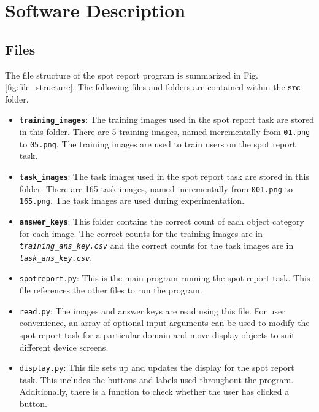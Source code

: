 \documentclass[preprint,12pt, a4paper]{elsarticle}
\begin{document}
\section{Software Description}

\subsection{Files}
The file structure of the spot report program is summarized in Fig.\ref{fig:file_structure}. The following files and folders are contained within the \textbf{src} folder. 

\begin{itemize}
    \item \texttt{\textbf{training\_images}}: The training images used in the spot report task are stored in this folder. There are 5 training images, named incrementally from \texttt{01.png} to \texttt{05.png}. The training images are used to train users on the spot report task.

    \item \texttt{\textbf{task\_images}}: The task images used in the spot report task are stored in this folder. There are 165 task images, named incrementally from \texttt{001.png} to \texttt{165.png}. The task images are used during experimentation.
    
    \item \texttt{\textbf{answer\_keys}}: This folder contains the correct count of each object category for each image. The correct counts for the training images are in \textit{\texttt{training\_ans\_key.csv}} and the correct counts for the task images are in \textit{\texttt{task\_ans\_key.csv}}.

    \item \texttt{spotreport.py}: This is the main program running the spot report task. This file references the other files to run the program.

    \item \texttt{read.py}: The images and answer keys are read using this file. For user convenience, an array of optional input arguments can be used to modify the spot report task for a particular domain and move display objects to suit different device screens.

    \item \texttt{display.py}: This file sets up and updates the display for the spot report task. This includes the buttons and labels used throughout the program. Additionally, there is a function to check whether the user has clicked a button.
    

\end{itemize}
\end{document}
